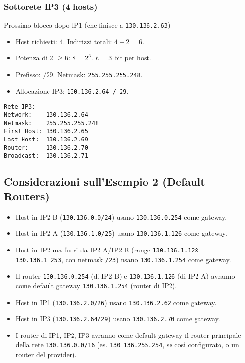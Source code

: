 \documentclass{article}
\begin{document}
\subsubsection{Sottorete IP3 (4 hosts)}
Prossimo blocco dopo IP1 (che finisce a \texttt{130.136.2.63}).
\begin{itemize}
    \item Host richiesti: 4. Indirizzi totali: $4 + 2 = 6$.
    \item Potenza di 2 $\geq 6$: $8 = 2^3$. $h=3$ bit per host.
    \item Prefisso: $/29$. Netmask: \texttt{255.255.255.248}.
    \item Allocazione IP3: \texttt{130.136.2.64 / 29}.
\end{itemize}
\begin{verbatim}
Rete IP3:
Network:    130.136.2.64
Netmask:    255.255.255.248
First Host: 130.136.2.65
Last Host:  130.136.2.69
Router:     130.136.2.70
Broadcast:  130.136.2.71
\end{verbatim}

\subsection{Considerazioni sull'Esempio 2 (Default Routers)}
\begin{itemize}
    \item Host in IP2-B (\texttt{130.136.0.0/24}) usano \texttt{130.136.0.254} come gateway.
    \item Host in IP2-A (\texttt{130.136.1.0/25}) usano \texttt{130.136.1.126} come gateway.
    \item Host in IP2 ma fuori da IP2-A/IP2-B (range \texttt{130.136.1.128} - \texttt{130.136.1.253}, con netmask \texttt{/23}) usano \texttt{130.136.1.254} come gateway.
    \item Il router \texttt{130.136.0.254} (di IP2-B) e \texttt{130.136.1.126} (di IP2-A) avranno come default gateway \texttt{130.136.1.254} (router di IP2).
    \item Host in IP1 (\texttt{130.136.2.0/26}) usano \texttt{130.136.2.62} come gateway.
    \item Host in IP3 (\texttt{130.136.2.64/29}) usano \texttt{130.136.2.70} come gateway.
    \item I router di IP1, IP2, IP3 avranno come default gateway il router principale della rete \texttt{130.136.0.0/16} (es. \texttt{130.136.255.254}, se così configurato, o un router del provider).
\end{itemize}
\end{document}
